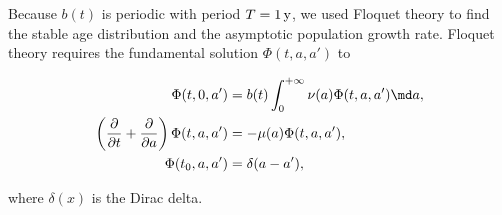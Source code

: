 \documentclass{jpmarticle}
\let\subequationsorig\subequations%
\let\endsubequationsorig\endsubequations%
\renewenvironment{subequations}{
  \subequationsorig
  \renewcommand{\theequation}{\theparentequation.\arabic{equation}}
}{
  \endsubequationsorig
}
\begin{document}
Because $b(t)$ is periodic with period $T = \unit[1]{y}$, we used
Floquet theory \autocite{parker_1992} to find the stable age
distribution and the asymptotic population growth rate. Floquet theory
requires the fundamental solution $\Phi(t, a, a')$ to
\begin{subequations}
  \begin{align}
    \Phi(t, 0, a')
    &= b(t) \int_0^{+\infty} \nu(a) \Phi(t, a, a') \md a,
    \\
    \left(\frac{\partial}{\partial t}
      + \frac{\partial}{\partial a}\right)
    \Phi(t, a, a')
    &= - \mu(a) \Phi(t, a, a'),
    \\
    \Phi(t_0, a, a')
    &= \delta(a - a'),
  \end{align}
\end{subequations}
where $\delta(x)$ is the Dirac delta.
\end{document}
